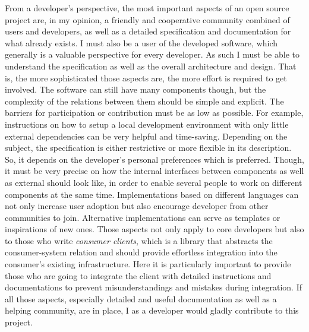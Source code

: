 \documentclass[12pt,english,a4paper,titlepage,cleardoublepage=empty,dottedtoc]{report}
\begin{document}
From a developer's perspective, the most important aspects of an open
source project are, in my opinion, a friendly and cooperative community
combined of users and developers, as well as a detailed specification
and documentation for what already exists. I must also be a user of the
developed software, which generally is a valuable perspective for every
developer. As such I must be able to understand the specification as
well as the overall architecture and design. That is, the more
sophisticated those aspects are, the more effort is required to get
involved. The software can still have many components though, but the
complexity of the relations between them should be simple and explicit.
The barriers for participation or contribution must be as low as
possible. For example, instructions on how to setup a local development
environment with only little external dependencies can be very helpful
and time-saving. Depending on the subject, the specification is either
restrictive or more flexible in its description. So, it depends on the
developer's personal preferences which is preferred. Though, it must be
very precise on how the internal interfaces between components as well
as external should look like, in order to enable several people to work
on different components at the same time. Implementations based on
different languages can not only increase user adoption but also
encourage developer from other communities to join. Alternative
implementations can serve as templates or inspirations of new ones.
Those aspects not only apply to core developers but also to those who
write \emph{consumer clients}, which is a library that abstracts the
consumer-system relation and should provide effortless integration into
the consumer's existing infrastructure. Here it is particularly
important to provide those who are going to integrate the client with
detailed instructions and documentations to prevent misunderstandings
and mistakes during integration. If all those aspects, especially
detailed and useful documentation as well as a helping community, are in
place, I as a developer would gladly contribute to this project.
\end{document}
